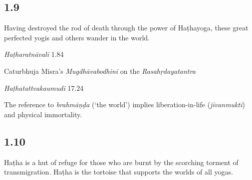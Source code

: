 \begin{ekdosis}
\subsection*{1.9}
\begin{translation}[hp01_009]
Having destroyed the rod of death through the power of Haṭhayoga, these great perfected yogis and others wander in the world.
\end{translation}

\begin{testimonia}[hp01_009]
\emph{Haṭharatnāvalī} 1.84

\begin{versinnote}
\end{versinnote}

Caturbhuja Misra's \emph{Mugdhāvabodhinī} on the \emph{Rasahṛdayatantra}

\begin{versinnote}
\end{versinnote}

\emph{Haṭhatattvakaumudī} 17.24

\begin{versinnote}
\end{versinnote}

\end{testimonia}

\begin{philcomm}[hp01_009]        
The reference to \emph{brahmāṇḍa} (‘the world’) implies liberation-in-life (\emph{jīvanmukti}) and physical immortality.  
\end{philcomm}

\subsection*{1.10}
\begin{translation}[hp01_010]
Haṭha is a hut of refuge for those who are burnt by the scorching torment of transmigration. Haṭha is the tortoise that supports the worlds of all yogas.
\end{translation}


\end{ekdosis}
